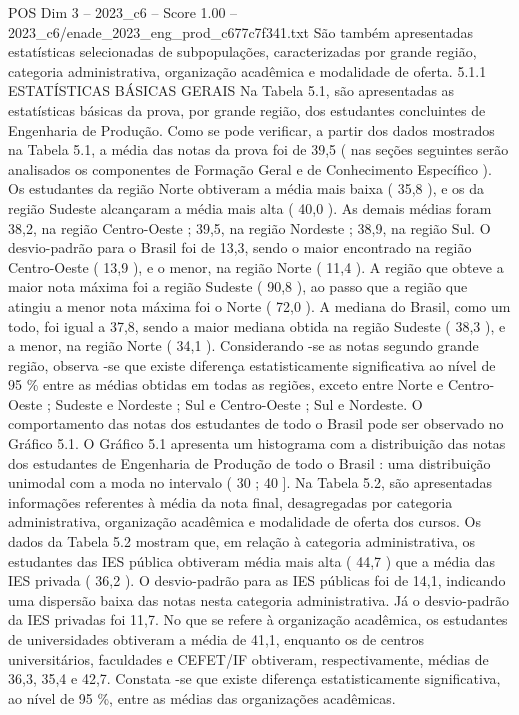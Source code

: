 \begin{textsample}{POS Dim 3 – 2023\_c6 – Score 1.00 – 2023\_c6/enade\_2023\_eng\_prod\_c677c7f341.txt}
São também apresentadas estatísticas selecionadas de subpopulações, caracterizadas por grande região, categoria administrativa, organização acadêmica e modalidade de oferta. 5.1.1 ESTATÍSTICAS BÁSICAS GERAIS Na Tabela 5.1, são apresentadas as estatísticas básicas da prova, por grande região, dos estudantes concluintes de Engenharia de Produção.
Como se pode verificar, a partir dos dados mostrados na Tabela 5.1, a média das notas da prova foi de 39,5 ( nas seções seguintes serão analisados os componentes de Formação Geral e de Conhecimento Específico ).
Os estudantes da região Norte obtiveram a média mais baixa ( 35,8 ), e os da região Sudeste alcançaram a média mais alta ( 40,0 ).
As demais médias foram 38,2, na região Centro-Oeste ; 39,5, na região Nordeste ; 38,9, na região Sul.
O desvio-padrão para o Brasil foi de 13,3, sendo o maior encontrado na região Centro-Oeste ( 13,9 ), e o menor, na região Norte ( 11,4 ).
A região que obteve a maior nota máxima foi a região Sudeste ( 90,8 ), ao passo que a região que atingiu a menor nota máxima foi o Norte ( 72,0 ).
A mediana do Brasil, como um todo, foi igual a 37,8, sendo a maior mediana obtida na região Sudeste ( 38,3 ), e a menor, na região Norte ( 34,1 ).
Considerando -se as notas segundo grande região, observa -se que existe diferença estatisticamente significativa ao nível de 95 \% entre as médias obtidas em todas as regiões, exceto entre Norte e Centro-Oeste ; Sudeste e Nordeste ; Sul e Centro-Oeste ; Sul e Nordeste.
O comportamento das notas dos estudantes de todo o Brasil pode ser observado no Gráfico 5.1.
O Gráfico 5.1 apresenta um histograma com a distribuição das notas dos estudantes de Engenharia de Produção de todo o Brasil : uma distribuição unimodal com a moda no intervalo ( 30 ; 40 ].
Na Tabela 5.2, são apresentadas informações referentes à média da nota final, desagregadas por categoria administrativa, organização acadêmica e modalidade de oferta dos cursos.
Os dados da Tabela 5.2 mostram que, em relação à categoria administrativa, os estudantes das IES pública obtiveram média mais alta ( 44,7 ) que a média das IES privada ( 36,2 ).
O desvio-padrão para as IES públicas foi de 14,1, indicando uma dispersão baixa das notas nesta categoria administrativa.
Já o desvio-padrão da IES privadas foi 11,7.
No que se refere à organização acadêmica, os estudantes de universidades obtiveram a média de 41,1, enquanto os de centros universitários, faculdades e CEFET/IF obtiveram, respectivamente, médias de 36,3, 35,4 e 42,7.
Constata -se que existe diferença estatisticamente significativa, ao nível de 95 \%, entre as médias das organizações acadêmicas.

\end{textsample}
